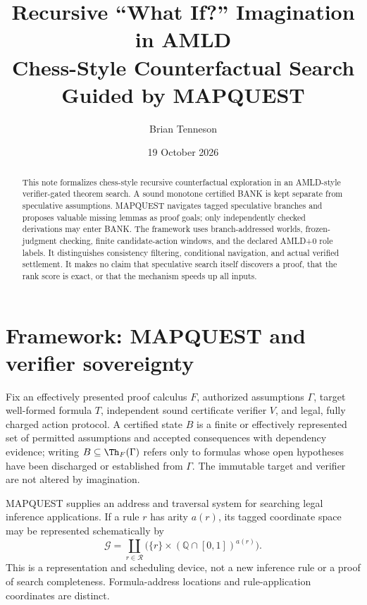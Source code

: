 
\title{\textbf{Recursive ``What If?'' Imagination in AMLD}\\[0.35em]\large Chess-Style Counterfactual Search Guided by MAPQUEST}
\author{Brian Tenneson}
\date{19 October 2026}
\maketitle
\begin{abstract}
This note formalizes chess-style recursive counterfactual exploration in an AMLD-style verifier-gated theorem search. A sound monotone certified BANK is kept separate from speculative assumptions. MAPQUEST navigates tagged speculative branches and proposes valuable missing lemmas as proof goals; only independently checked derivations may enter BANK. The framework uses branch-addressed worlds, frozen-judgment checking, finite candidate-action windows, and the declared AMLD+0 role labels. It distinguishes consistency filtering, conditional navigation, and actual verified settlement. It makes no claim that speculative search itself discovers a proof, that the rank score is exact, or that the mechanism speeds up all inputs.
\end{abstract}
\section{Framework: MAPQUEST and verifier sovereignty}
Fix an effectively presented proof calculus $F$, authorized assumptions $\Gamma$, target well-formed formula $T$, independent sound certificate verifier $V$, and legal, fully charged action protocol. A certified state $B$ is a finite or effectively represented set of permitted assumptions and accepted consequences with dependency evidence; writing $B\subseteq\Th_F(\Gamma)$ refers only to formulas whose open hypotheses have been discharged or established from $\Gamma$. The immutable target and verifier are not altered by imagination.

MAPQUEST supplies an address and traversal system for searching legal inference applications. If a rule $r$ has arity $a(r)$, its tagged coordinate space may be represented schematically by
\[\mathcal G=\coprod_{r\in\mathcal R}\bigl(\{r\}\times(\mathbb Q\cap[0,1])^{a(r)}\bigr).\]
This is a representation and scheduling device, not a new inference rule or a proof of search completeness. Formula-address locations and rule-application coordinates are distinct.


